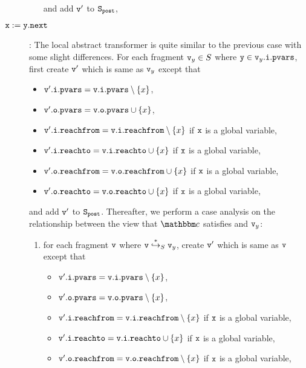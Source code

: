 \begin{description}
\begin{enumerate}
\begin{itemize}
\end{itemize}
and add $\mathtt{v}'$ to $\tt S_{post}$,
\end{enumerate}
\item[${\tt x := y.next}$]: The local abstract transformer is quite similar to the previous case with some slight differences. For each fragment $\mathtt{v}_y \in S$ where $\mathtt{y} \in \mathtt{v}_y.\mathtt{i}.\mathtt{pvars}$, first
create $\mathtt{v}'$ which is same as $\mathtt{v}_y$ except that
\begin{itemize}
\item $\mathtt{v}'.\mathtt{i}.\mathtt{pvars} = \mathtt{v}.\mathtt{i}.\mathtt{pvars} \setminus \left\{x\right\}$,
\item $\mathtt{v}'.\mathtt{o}.\mathtt{pvars} = \mathtt{v}.\mathtt{o}.\mathtt{pvars} \cup \left\{x\right\}$,
\item $\mathtt{v}'.\mathtt{i}.\mathtt{reachfrom} = \mathtt{v}.\mathtt{i}.\mathtt{reachfrom} \setminus \left\{x\right\}$ if $\tt x$ is a global variable,
\item $\mathtt{v}'.\mathtt{i}.\mathtt{reachto} = \mathtt{v}.\mathtt{i}.\mathtt{reachto} \cup \left\{x\right\}$ if $\tt x$ is a global variable,
 \item $\mathtt{v}'.\mathtt{o}.\mathtt{reachfrom} = \mathtt{v}.\mathtt{o}.\mathtt{reachfrom} \cup \left\{x\right\}$ if $\tt x$ is a global variable,
 \item $\mathtt{v}'.\mathtt{o}.\mathtt{reachto} = \mathtt{v}.\mathtt{o}.\mathtt{reachto} \cup \left\{x\right\}$ if $\tt x$ is a global variable,
\end{itemize}
and add $\mathtt{v}'$ to $\tt S_{post}$. Thereafter, we perform a case analysis on
the relationship between the view that $\cell$ satisfies and $\mathtt{v}_y$:
\begin{enumerate}
\item  for each fragment $\mathtt{v}$ where $\mathtt{v} \overset{*}\hookrightarrow_S \mathtt{v}_y$, create $\mathtt{v}'$ which is same as $\mathtt{v}$ except that
\begin{itemize}
\item $\mathtt{v}'.\mathtt{i}.\mathtt{pvars} = \mathtt{v}.\mathtt{i}.\mathtt{pvars} \setminus \left\{x\right\}$,
\item $\mathtt{v}'.\mathtt{o}.\mathtt{pvars} = \mathtt{v}.\mathtt{o}.\mathtt{pvars} \setminus \left\{x\right\}$,
\item $\mathtt{v}'.\mathtt{i}.\mathtt{reachfrom} = \mathtt{v}.\mathtt{i}.\mathtt{reachfrom} \setminus \left\{x\right\}$ if $\tt x$ is a global variable,

\item $\mathtt{v}'.\mathtt{i}.\mathtt{reachto} = \mathtt{v}.\mathtt{i}.\mathtt{reachto} \cup \left\{x\right\}$ if $\tt x$ is a global variable,
\item $\mathtt{v}'.\mathtt{o}.\mathtt{reachfrom} = \mathtt{v}.\mathtt{o}.\mathtt{reachfrom} \setminus \left\{x\right\}$ if $\tt x$ is a global variable,


\end{itemize}
\end{enumerate}
\end{description}
